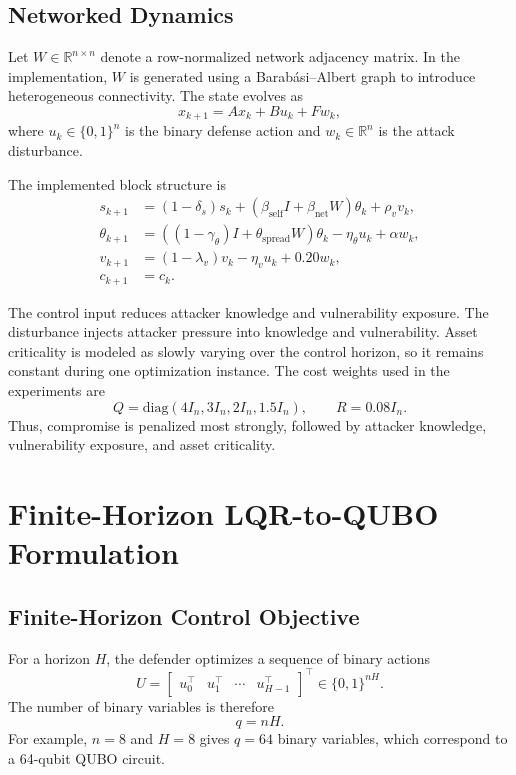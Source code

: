 \documentclass[runningheads]{llncs}
\begin{document}
\subsection{Networked Dynamics}

Let $W \in \mathbb{R}^{n \times n}$ denote a row-normalized network adjacency matrix. In the implementation, $W$ is generated using a Barabási--Albert graph to introduce heterogeneous connectivity. The state evolves as
\begin{equation}
x_{k+1}=Ax_k+Bu_k+Fw_k,
\label{eq:state}
\end{equation}
where $u_k \in \{0,1\}^{n}$ is the binary defense action and $w_k \in \mathbb{R}^{n}$ is the attack disturbance.

The implemented block structure is
\begin{align}
s_{k+1} &=
(1-\delta_s)s_k +
(\beta_{\mathrm{self}}I+\beta_{\mathrm{net}}W)\theta_k +
\rho_v v_k, \\
\theta_{k+1} &=
\left((1-\gamma_\theta)I+\theta_{\mathrm{spread}}W\right)\theta_k
-\eta_\theta u_k+\alpha w_k, \\
v_{k+1} &=
(1-\lambda_v)v_k-\eta_v u_k+0.20w_k, \\
c_{k+1} &= c_k.
\end{align}

The control input reduces attacker knowledge and vulnerability exposure. The disturbance injects attacker pressure into knowledge and vulnerability. Asset criticality is modeled as slowly varying over the control horizon, so it remains constant during one optimization instance. The cost weights used in the experiments are
\begin{equation}
Q=\mathrm{diag}(4I_n,3I_n,2I_n,1.5I_n), \qquad R=0.08I_n.
\end{equation}
Thus, compromise is penalized most strongly, followed by attacker knowledge, vulnerability exposure, and asset criticality.

\section{Finite-Horizon LQR-to-QUBO Formulation}

\subsection{Finite-Horizon Control Objective}

For a horizon $H$, the defender optimizes a sequence of binary actions
\begin{equation}
U=
\begin{bmatrix}
u_0^\top & u_1^\top & \cdots & u_{H-1}^\top
\end{bmatrix}^{\top}
\in \{0,1\}^{nH}.
\end{equation}
The number of binary variables is therefore
\begin{equation}
q=nH.
\end{equation}
For example, $n=8$ and $H=8$ gives $q=64$ binary variables, which correspond to a 64-qubit QUBO circuit.
\end{document}
